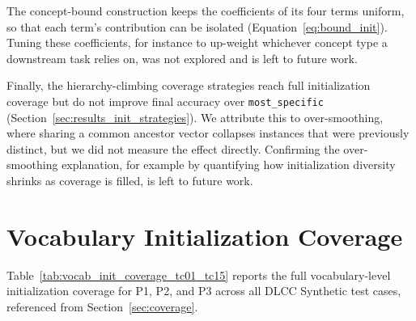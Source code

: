 \documentclass[a4paper,oneside,bibliography=totoc]{scrbook}
\begin{document}
The concept-bound construction keeps the coefficients of its four terms uniform,
so that each term's contribution can be isolated
(Equation~\eqref{eq:bound_init}). Tuning these coefficients, for instance to
up-weight whichever concept type a downstream task relies on, was not explored
and is left to future work.

Finally, the hierarchy-climbing coverage strategies reach full initialization
coverage but do not improve final accuracy over \texttt{most\_specific}
(Section~\ref{sec:results_init_strategies}). We attribute this to over-smoothing,
where sharing a common ancestor vector collapses instances that were previously
distinct, but we did not measure the effect directly. Confirming the
over-smoothing explanation, for example by quantifying how initialization
diversity shrinks as coverage is filled, is left to future work.




\appendix

\section{Vocabulary Initialization Coverage}
\label{app:vocab-coverage}

Table~\ref{tab:vocab_init_coverage_tc01_tc15} reports the full vocabulary-level
initialization coverage for P1, P2, and P3 across all DLCC Synthetic test cases,
referenced from Section~\ref{sec:coverage}.
\end{document}
